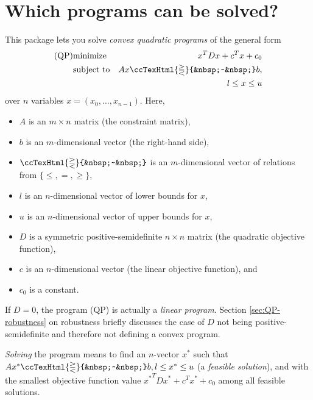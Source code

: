 \newcommand{\qprel}{\ccTexHtml{\gtreqless}{&nbsp;~&nbsp;}}

\label{QPsolver}

\section{Which programs can be solved?}
\label{sec:QP-def}
This package lets you solve \emph{convex quadratic programs} of the 
general form
\begin{eqnarray*}
\mbox{(QP)}&\mbox{minimize} & x^{T}Dx + c^{T}x + c_0 \\
&\mbox{subject to}   & Ax\qprel b, \\
&& l \leq x \leq u
\end{eqnarray*}
over $n$ variables $x=(x_0,\ldots,x_{n-1})$.
Here, 
\begin{itemize}
\item $A$ is an $m\times n$ matrix (the constraint matrix), 
\item $b$ is an $m$-dimensional vector (the right-hand side),
\item $\qprel$ is an $m$-dimensional vector of relations 
from $\{\leq, =, \geq\}$, 
\item $l$ is an $n$-dimensional vector of lower
bounds for $x$,
\item $u$ is an $n$-dimensional vector of upper bounds for
$x$, 
\item $D$ is a symmetric positive-semidefinite $n\times n$ matrix (the
  quadratic objective function),
\item $c$ is an $n$-dimensional vector (the linear objective
  function), and 
\item $c_0$ is a constant.
\end{itemize}

If $D=0$, the program (QP) is actually a \emph{linear program}.
Section \ref{sec:QP-robustness} on robustness briefly discusses
the case of $D$ not being positive-semidefinite and therefore not
defining a convex program. 

\emph{Solving} the program means to find an $n$-vector $x^*$ 
such that $Ax^*\qprel b, l\leq x^*\leq u$ (a \emph{feasible solution}),
and with the smallest objective function value ${x^*}^TDx^*+c^Tx^*+c_0$ 
among all feasible solutions. 

